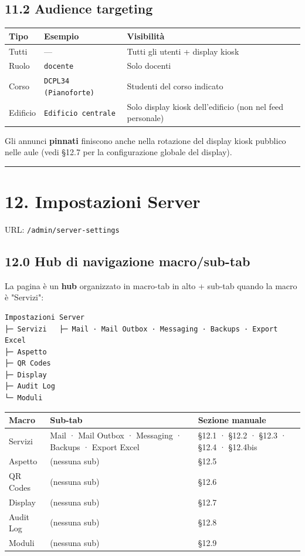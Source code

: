 \documentclass[11pt,a4paper]{article}
\begin{document}
\subsection{11.2 Audience targeting}


\begin{table}[H]
\centering
\small
\begin{tabularx}{\linewidth}{|X|X|X|}
\hline
\rowcolor{tableheader} Tipo & Esempio & Visibilità \\
\hline
Tutti & --- & Tutti gli utenti + display kiosk \\
\hline
Ruolo & \texttt{docente} & Solo docenti \\
\hline
Corso & \texttt{DCPL34 (Pianoforte)} & Studenti del corso indicato \\
\hline
Edificio & \texttt{Edificio centrale} & Solo display kiosk dell'edificio (non nel feed personale) \\
\hline
\end{tabularx}
\end{table}


Gli annunci \textbf{pinnati} finiscono anche nella rotazione del display kiosk pubblico nelle aule (vedi §12.7 per la configurazione globale del display).

\medskip\hrule\medskip

\section{12. Impostazioni Server}


URL: \texttt{/admin/server-settings}

\subsection{12.0 Hub di navigazione macro/sub-tab}


La pagina è un \textbf{hub} organizzato in macro-tab in alto + sub-tab quando la macro è "Servizi":

\begin{lstlisting}
Impostazioni Server
├─ Servizi   ├─ Mail · Mail Outbox · Messaging · Backups · Export Excel
├─ Aspetto
├─ QR Codes
├─ Display
├─ Audit Log
└─ Moduli
\end{lstlisting}

\begin{table}[H]
\centering
\small
\begin{tabularx}{\linewidth}{|X|X|X|}
\hline
\rowcolor{tableheader} Macro & Sub-tab & Sezione manuale \\
\hline
Servizi & Mail · Mail Outbox · Messaging · Backups · Export Excel & §12.1 · §12.2 · §12.3 · §12.4 · §12.4bis \\
\hline
Aspetto & (nessuna sub) & §12.5 \\
\hline
QR Codes & (nessuna sub) & §12.6 \\
\hline
Display & (nessuna sub) & §12.7 \\
\hline
Audit Log & (nessuna sub) & §12.8 \\
\hline
Moduli & (nessuna sub) & §12.9 \\
\hline
\end{tabularx}
\end{table}
\end{document}
